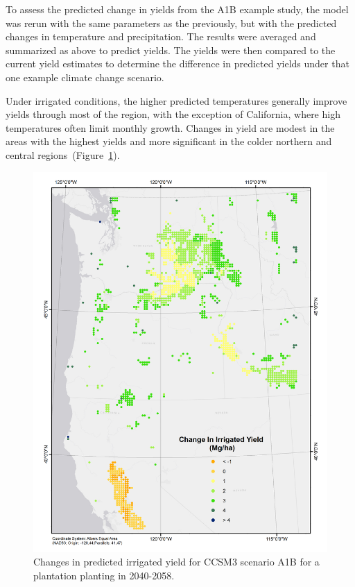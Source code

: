 \documentclass[preprint,12pt]{elsarticle}
\begin{document}

To assess the predicted change in yields from the A1B example study,
the model was rerun with the same parameters as the previously, but
with the predicted changes in temperature and precipitation.  The
results were averaged and summarized as above to predict yields.  The
yields were then compared to the current yield estimates to determine
the difference in predicted yields under that one example climate
change scenario.

Under irrigated conditions, the higher predicted temperatures
generally improve yields through most of the region, with the
exception of California, where high temperatures often limit monthly
growth.  Changes in yield are modest in the areas with the highest
yields and more significant in the colder northern and central
regions~(Figure~\ref{fig:new_irrigated}).
 
\begin{figure}[hp]
  \centering
  \includegraphics[width=1\linewidth]{climate_irrigated}
  \caption{Changes in predicted irrigated yield for \ac{CCSM3} scenario A1B
    for a plantation planting in 2040-2058.}
  \label{fig:new_irrigated}
\end{figure}
\end{document}
